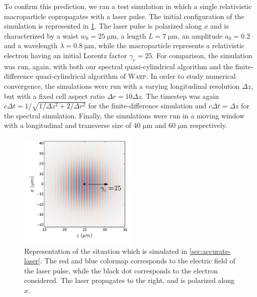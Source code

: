 \documentclass[1p,times,authoryear]{elsarticle}
\begin{document}
To confirm this prediction, we ran a test simulation in which a single
relativistic macroparticle copropagates with a laser pulse. The initial configuration of
the simulation is represented in \cref{fig:Schematic_laser}. The laser
pulse is polarized along $x$ and is characterized by a waist $w_0 = 25\;\mathrm{\mu m}$,
a length $L=7\;\mathrm{\mu m}$, an amplitude $a_0 = 0.2$ and a
wavelength $\lambda = 0.8\;\mathrm{\mu m}$, while the macroparticle
represents a relativistic electron having an initial Lorentz factor
$\gamma_e = 25$. For comparison, the simulation was run, again, with both our spectral
quasi-cylindrical algorithm and the finite-difference
quasi-cylindrical algorithm of \textsc{Warp}. In order to study
numerical convergence, the simulations were run with a varying
longitudinal resolution $\Delta z$, but with a fixed cell aspect ratio
$\Delta r = 10\Delta z$. The timestep was again $c\Delta t=
1/\sqrt{1/\Delta z^2 + 2/\Delta r^2}$ for the finite-difference
simulation and $c\Delta t = \Delta z$ for the spectral
simulation. Finally, the simulations were run in a moving window with a
longitudinal and transverse size of 40 $\mathrm{\mu m}$ and 60 
$\mathrm{\mu m}$ respectively.

\begin{figure}[!h]
\centering
\includegraphics[width=0.5\textwidth]{figures/Schematic_laser.pdf}
\caption{\label{fig:Schematic_laser}Representation of the situation
  which is simulated in \cref{sec:accurate-laser}. The red and blue
  colormap corresponds to the electric field of the laser pulse, while
  the black dot corresponds to the electron considered. 
The laser propagates to the right, and is polarized along $x$.}
\end{figure}
\end{document}
